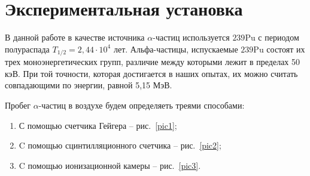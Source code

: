 \documentclass{article}
\begin{document}
\section{Экспериментальная установка}
		В данной работе в качестве источника $\alpha$-частиц используется ${239}$Pu с периодом полураспада $T_{1/2} = 2,44 \cdot 10^4$ лет. Альфа-частицы, испускаемые ${239}$Pu состоят их трех моноэнергетических групп, различие между которыми лежит в пределах 50 кэВ. При той точности, которая достигается в наших опытах, их можно считать совпадающими по энергии, равной 5,15 МэВ.
 
 Пробег $\alpha$-частиц в воздухе будем определяеть треями способами:
	\begin{enumerate}
		\item
			С помощью счетчика Гейгера -- рис.~\ref{pic1};
		\item
			C помощью сцинтилляционного счетчика -- рис.~\ref{pic2};
		\item
			C помощью ионизационной камеры -- рис.~\ref{pic3}.
	\end{enumerate} 
	
\end{document}
